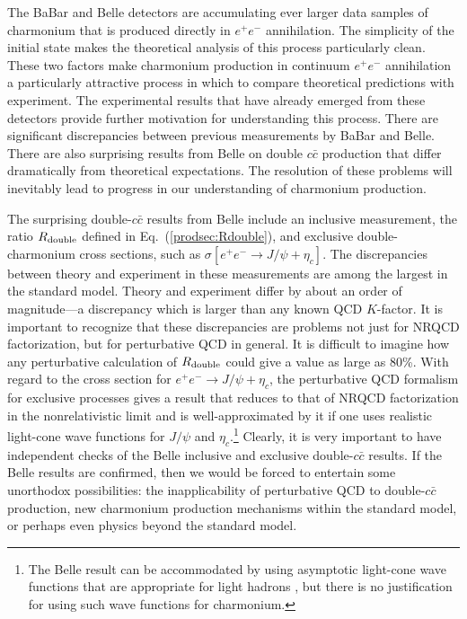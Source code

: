 The BaBar and Belle detectors are accumulating ever larger data 
samples of charmonium that is produced directly in $e^+ e^-$ annihilation.
The simplicity of the initial state makes the theoretical analysis 
of this process particularly clean.  These two factors
make charmonium production in continuum $e^+ e^-$ annihilation a
particularly attractive process in which to compare theoretical
predictions with experiment.  The experimental results that have already 
emerged from these detectors provide further motivation for 
understanding this process.  There are 
significant discrepancies between previous measurements 
by BaBar and Belle.  There are also surprising results from Belle 
on double $c \bar c$ production that differ dramatically from theoretical
expectations.  The resolution of these problems will inevitably 
lead to progress in our understanding of charmonium production.


The surprising double-$c \bar c$ results from Belle include 
an inclusive measurement, the ratio $R_{\rm double}$ defined in 
Eq.~(\ref{prodsec:Rdouble}), and exclusive double-charmonium 
cross sections, such as $\sigma[e^+e^-\to J/\psi+\eta_c]$.
The discrepancies between theory and experiment in these measurements
are among the largest in the standard model. Theory and
experiment differ by about an order of magnitude---a discrepancy which
is larger than any known QCD $K$-factor.  It is important to
recognize that these discrepancies are problems not just for NRQCD
factorization, but for perturbative QCD in general. 
It is difficult to imagine how any perturbative calculation 
of $R_{\rm double}$ could give a value as large as 80\%.
With regard to the cross section for $e^+e^-\to J/\psi+\eta_c$,
the perturbative QCD formalism for exclusive processes 
\cite{brodsky-ji-lee} gives a result that reduces to that of
NRQCD factorization \cite{Braaten:2002fi,Liu:2002wq} in the
nonrelativistic limit and is well-approximated by it if one uses
realistic light-cone wave functions for $J/\psi$ and $\eta_c$.\footnote{
The Belle result can be accommodated by using asymptotic light-cone
wave functions that are appropriate for light hadrons
\cite{Ma:2004qf}, but there is no justification for using such
wave functions for charmonium.} 
Clearly, it is very important to have independent checks of the Belle
inclusive and exclusive double-$c \bar c$ results. If the Belle
results are confirmed, then we would be forced to entertain some
unorthodox possibilities: the inapplicability of perturbative QCD to
double-$c \bar c$ production, new charmonium production mechanisms
within the standard model, or perhaps even physics beyond the standard
model. 

